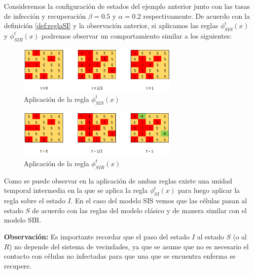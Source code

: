 \begin{example}\label{ex:SISySIRenAutomatasCelulares}
Consideremos la configuración de estados del ejemplo anterior junto con las tasas de infección y recuperación $\beta=0.5$ y $\alpha=0.2$ respectivamente. De acuerdo con la definición \ref{def:reglaSI} y la observación anterior, si aplicamos las reglas $\phi_{SIS}^t(x)$ y $\phi_{SIR}^t(x)$ podremos observar un comportamiento similar a los siguientes:

\newpage

\begin{figure}[h]
  \centering
    \includegraphics[width=0.7\textwidth]{Imagenes/sisAplication.PNG}
    \caption{Aplicación de la regla $\phi_{SIS}^t(x)$}
\end{figure}

\begin{figure}[h]
  \centering
    \includegraphics[width=0.7\textwidth]{Imagenes/sirAplication.PNG}
    \caption{Aplicación de la regla $\phi_{SIR}^t(x)$}
\end{figure}

Como se puede observar en la aplicación de ambas reglas existe una unidad temporal intermedia en la que se aplica la regla $\phi_{SI}^t(x)$ para luego aplicar la regla sobre el estado $I$. En el caso del modelo SIS vemos que las células pasan al estado $S$ de acuerdo con las reglas del modelo clásico y de manera similar con el modelo SIR.
\end{example}

\textbf{Observación:} Es importante recordar que el paso del estado $I$ al estado $S$ (o al $R$) no depende del sistema de vecindades, ya que se asume que no es necesario el contacto con células no infectadas para que una que se encuentra enferma se recupere.


